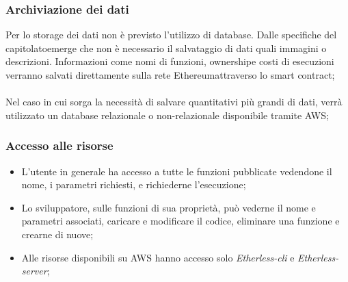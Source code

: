 \subsubsection{Archiviazione dei dati}
Per lo storage dei dati non è previsto l'utilizzo di database. Dalle specifiche del capitolato\glo emerge che non è necessario il salvataggio di dati quali immagini o descrizioni. Informazioni come nomi di funzioni, ownership\glo e costi di esecuzioni verranno salvati direttamente sulla rete Ethereum\glo attraverso lo smart contract\glos; 
\\\\
Nel caso in cui sorga la necessità di salvare quantitativi più grandi di dati, verrà utilizzato un database relazionale o non-relazionale disponibile tramite AWS;
\subsubsection{Accesso alle risorse}
\begin{itemize}
	\item L'utente in generale ha accesso a tutte le funzioni pubblicate vedendone il nome, i parametri richiesti, e richiederne l'esecuzione;
	\item Lo sviluppatore, sulle funzioni di sua proprietà, può vederne il nome e parametri associati, caricare e modificare il codice, eliminare una funzione e crearne di nuove;
	\item Alle risorse disponibili su AWS hanno accesso solo \textit{Etherless-cli} e \textit{Etherless-server};
\end{itemize}
